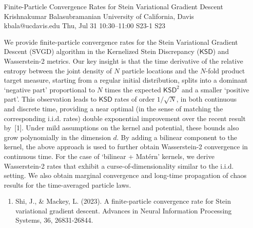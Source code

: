 \begin{talk}
  {Finite-Particle Convergence Rates for Stein Variational Gradient Descent}%
  {Krishnakumar Balasubramanian}%
  {University of California, Davis}%
  {kbala@ucdavis.edu}%
  {}%
  {}%
  {Thu, Jul 31 10:30--11:00}%
  {S23-1}%
  {S23}%
  {}%
  
    
   
 We provide finite-particle convergence rates for the Stein Variational Gradient Descent (SVGD) algorithm in the Kernelized Stein Discrepancy ($\mathsf{KSD}$) and Wasserstein-2 metrics. Our key insight is that the time derivative of the relative entropy between the joint density of $N$ particle locations and the $N$-fold product target measure, starting from a regular initial distribution, splits into a dominant `negative part' proportional to $N$ times the expected $\mathsf{KSD}^2$ and a smaller `positive part'. This observation leads to $\mathsf{KSD}$ rates of order $1/\sqrt{N}$, in both continuous and discrete time, providing a near optimal (in the sense of matching the corresponding i.i.d. rates) double exponential improvement over the recent result by~[1]. Under mild assumptions on the kernel and potential, these bounds also grow polynomially in the dimension $d$. By adding a bilinear component to the kernel, the above approach is used to further obtain Wasserstein-2 convergence in continuous time. For the case of `bilinear + Mat\'ern' kernels, we derive Wasserstein-2 rates that exhibit a curse-of-dimensionality similar to the i.i.d. setting. We also obtain marginal convergence and long-time propagation of chaos results for the time-averaged particle laws. 

\medskip


\begin{enumerate}
 \item[{[1]}] Shi, J., \& Mackey, L. (2023). A finite-particle convergence rate for Stein variational gradient descent. Advances in Neural Information Processing Systems, 36, 26831-26844.
\end{enumerate}

\end{talk}

